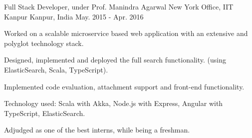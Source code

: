 \begin{cventries}
  \cventry
  {Full Stack Developer, under Prof. Manindra Agarwal}
  {New York Office, IIT Kanpur}
  {Kanpur, India}
  {May. 2015 - Apr. 2016}
  {
    \begin{cvitems}
    \item Worked on a scalable microservice based web application with an extensive and polyglot technology stack.
    \item Designed, implemented and deployed the full search functionality.
      (using ElasticSearch, Scala, TypeScript).
    \item Implemented code evaluation, attachment support and
      front-end functionality.
    \item Technology used: Scala with Akka, Node.js with Express,
      Angular with TypeScript, ElasticSearch.
    \item Adjudged as one of the best interns, while being a freshman.
    \end{cvitems}
  }

\end{cventries}

